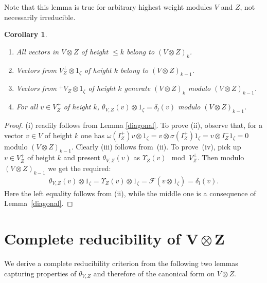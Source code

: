\documentclass[11pt]{article}
\numberwithin{equation}{section}
\newtheorem{Corollary}[Theorem]{Corollary}
\begin{document}
Note that this lemma is true for arbitrary highest weight modules $V$ and $Z$, not necessarily irreducible.
\begin{Corollary}\label{two-filtrations}\quad
\begin{enumerate}\itemsep=0pt
 \item[$i)$] All vectors in $V\otimes Z$ of height $\leqslant k$ belong to $(V\otimes Z)_{k}$.
\item[$ii)$] Vectors from $V^\perp_Z\otimes 1_\zeta$ of height $k$ belong to $(V\otimes Z)_{k-1}$.
 \item[$iii)$] Vectors from ${}^+\!V_Z\otimes 1_\zeta$ of height $k$ generate $(V\otimes Z)_k$ modulo $(V\otimes Z)_{k-1}$.
\item[$iv)$] For all $v\in V^+_Z$ of height $k$, $\theta_{V,Z}(v)\otimes 1_\zeta=\delta_l(v)$ modulo $(V\otimes Z)_{k-1}$.
\end{enumerate}
\end{Corollary}
\begin{proof}(i) readily follows from Lemma \ref{diagonal}. To prove (ii), observe that, for a vector $v\in V$ of height $k$ one has $\omega(I^+_Z)v\otimes 1_\zeta=v\otimes \sigma(I^+_Z) 1_\zeta=v\otimes I^-_Z 1_\zeta =0$
modulo $(V\otimes Z)_{k-1}$. Clearly (iii) follows from~(ii). To prove~(iv), pick up $v\in V^+_Z$ of height $k$ and present $\theta_{V,Z}(v)$ as $\Upsilon_Z(v) \mod V^\perp_Z$. Then modulo $(V\otimes Z)_{k-1}$ we get the required:
\begin{gather*}
\theta_{V,Z}(v)\otimes 1_\zeta=\Upsilon_Z(v) \otimes 1_\zeta = \mathcal{F}(v\otimes 1_\zeta)=\delta_l(v).
\end{gather*}
Here the left equality follows from (ii), while the middle one is a consequence of Lemma~\ref{diagonal}.
\end{proof}

\section[Complete reducibility of $V\otimes Z$]{Complete reducibility of $\boldsymbol{V\otimes Z}$}
We derive a complete reducibility criterion from the following two lemmas capturing properties of $\theta_{V,Z}$ and therefore of the canonical form on $V\otimes Z$.
\end{document}
